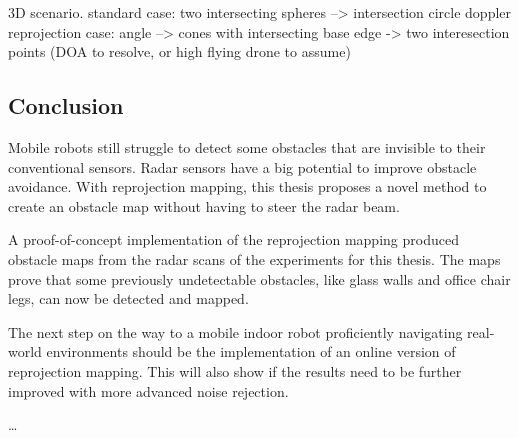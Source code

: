 3D scenario. standard case: two intersecting spheres --\textgreater{}
intersection circle doppler reprojection case: angle --\textgreater{}
cones with intersecting base edge -\textgreater{} two interesection
points (DOA to resolve, or high flying drone to assume)

\subsection{Conclusion}\label{conclusion-1}

Mobile robots still struggle to detect some obstacles that are invisible
to their conventional sensors. Radar sensors have a big potential to
improve obstacle avoidance. With reprojection mapping, this thesis
proposes a novel method to create an obstacle map without having to
steer the radar beam.

A proof-of-concept implementation of the reprojection mapping produced
obstacle maps from the radar scans of the experiments for this thesis.
The maps prove that some previously undetectable obstacles, like glass
walls and office chair legs, can now be detected and mapped.

The next step on the way to a mobile indoor robot proficiently
navigating real-world environments should be the implementation of an
online version of reprojection mapping. This will also show if the
results need to be further improved with more advanced noise rejection.

\ldots{}